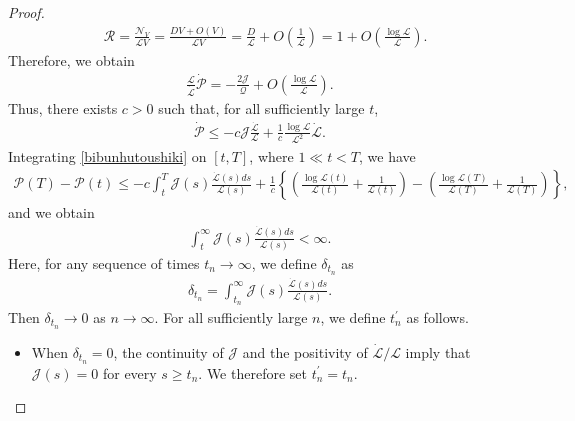 \documentclass[reqno]{amsart}
\theoremstyle{plain}
\theoremstyle{definition}
\numberwithin{equation}{section}
\begin{document}
\begin{proof}
\begin{align*}
&\mathcal{R}=\frac{\mathcal{N}_V}{\mathcal{L}V}=\frac{DV+O(V)}{\mathcal{L}V}=\frac{D}{\mathcal{L}}+O\left(\frac{1}{\mathcal{L}}\right)=1+O\left(\frac{\log{\mathcal{L}}}{\mathcal{L}}\right).
\end{align*}
Therefore, we obtain
\begin{align*}
\frac{\mathcal{L}}{\dot{\mathcal{L}}}\dot{\mathcal{P}}=-\frac{2\mathcal{J}}{\mathcal{Q}}+O\left(\frac{\log{\mathcal{L}}}{\mathcal{L}}\right).
\end{align*}
Thus, there exists $c>0$ such that, for all sufficiently large $t$,
\begin{align}\label{bibunhutoushiki}
\dot{\mathcal{P}}\leq -c\mathcal{J}\frac{\dot{\mathcal{L}}}{\mathcal{L}}+\frac{1}{c}\frac{\log{\mathcal{L}}}{\mathcal{L}^2}\dot{\mathcal{L}}.
\end{align}
Integrating \eqref{bibunhutoushiki} on $[t,T]$, where $1\ll t<T$, we have
\begin{align*}
\mathcal{P}(T)-\mathcal{P}(t)\leq -c\int_t^T\mathcal{J}(s)\frac{\dot{\mathcal{L}}(s)ds}{\mathcal{L}(s)}+\frac{1}{c}\left\{\left(\frac{\log{\mathcal{L}(t)}}{\mathcal{L}(t)}+\frac{1}{\mathcal{L}(t)}\right)-\left(\frac{\log{\mathcal{L}(T)}}{\mathcal{L}(T)}+\frac{1}{\mathcal{L}(T)}\right)\right\},
\end{align*}
and we obtain
\begin{align*}
\int_t^{\infty}\mathcal{J}(s)\frac{\dot{\mathcal{L}}(s)ds}{\mathcal{L}(s)}<\infty.
\end{align*}
Here, for any sequence of times $t_n\to\infty$, we define $\delta_{t_n}$ as 
\begin{align*}
\delta_{t_n}=\int_{t_n}^{\infty}\mathcal{J}(s)\frac{\dot{\mathcal{L}}(s)ds}{\mathcal{L}(s)}.
\end{align*}
Then $\delta_{t_n}\to 0$ as $n\to\infty$. For all sufficiently large $n$, we define $t_n^{\prime}$ as follows.
\begin{itemize}
\item When $\delta_{t_n}=0$, the continuity of $\mathcal{J}$ and the positivity of $\dot{\mathcal{L}}/\mathcal{L}$ imply that $\mathcal{J}(s)=0$ for every $s\geq t_n$. We therefore set $t_n^{\prime}=t_n$.


\end{itemize}
\end{proof}
\end{document}
